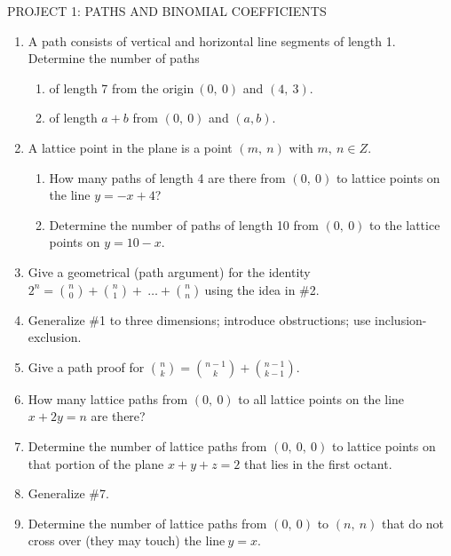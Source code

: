 \documentclass[10pt,letter]{article}
\begin{document}
PROJECT 1: PATHS AND BINOMIAL COEFFICIENTS
\begin{enumerate}
\def\labelenumi{\arabic{enumi}.}

\item
  A path consists of vertical and horizontal line segments of length 1.
  Determine the number of paths
\begin{enumerate}
  \def\labelenumii{\alph{enumii}.}

  \item
    of length 7 from the origin\(\ \left( 0,\ 0 \right)\) and
    \((4,\ 3)\).
  \item
    of length \(a + b\) from \(\left( 0,\ 0 \right)\) and \((a,b)\).

\end{enumerate}
\item
  A lattice point in the plane is a point \((m,\ n)\) with
  \(m,\ n \in Z\).
\begin{enumerate}
  \def\labelenumii{\alph{enumii}.}

  \item
    How many paths of length 4 are there from \((0,\ 0)\) to lattice
    points on the line \(y = - x + 4\)?
  \item
    Determine the number of paths of length 10 from \((0,\ 0)\) to the
    lattice points on \(y = 10 - x\).

\end{enumerate}
\item
  Give a geometrical (path argument) for the identity
  \(2^{n} =
\binom{n}{0}
 +
\binom{n}{1}
 + \ \ldots +
\binom{n}{n}
\ \)using the idea in \#2.
\item
  Generalize \#1 to three dimensions; introduce obstructions; use
  inclusion-exclusion.
\item
  Give a path proof for \(\binom{n}{k}
 =
\binom{n - 1}{k}
 +
\binom{n - 1}{k - 1}
\).
\item
  How many lattice paths from \(\left( 0,\ 0 \right)\) to all lattice
  points on the line \(x + 2y = n\) are there?
\item
  Determine the number of lattice paths from
  \(\left( 0,\ 0,\ 0 \right)\) to lattice points on that portion of the
  plane \(x + y + z = 2\) that lies in the first octant.
\item
  Generalize \#7.
\item
  Determine the number of lattice paths from \(\left( 0,\ 0 \right)\) to
  \((n,\ n)\) that do not cross over (they may touch) the
  line\(\ y = x\).

\end{enumerate}
\end{document}

